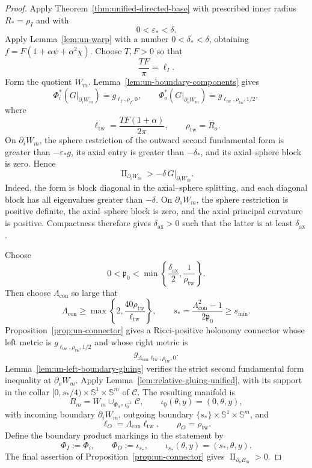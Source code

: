 \documentclass[11pt,reqno]{amsart}
\theoremstyle{definition}
\numberwithin{equation}{section}
\DeclareMathOperator{\II}{II}
\begin{document}
\begin{proof}
Apply Theorem~\ref{thm:unified-directed-base} with prescribed inner
radius \(R_*=\rho_I\) and with
\[
 0<\varepsilon_*<\delta.
\]
Apply Lemma~\ref{lem:un-warp} with a number
\(0<\delta_*<\delta\), obtaining
\(f=F(1+\alpha\psi+\alpha^2\chi)\).
Choose \(T,F>0\) so that
\[
 \frac{TF}{\pi}=\ell_I.
\]
Form the quotient \(W_m\).  Lemma~\ref{lem:un-boundary-components}
gives
\[
 \Phi_i^*(G|_{\partial_iW_m})=g_{\ell_I,\rho_I,0},
 \qquad
 \Phi_o^*(G|_{\partial_oW_m})
 =g_{\ell_{\mathrm{tw}},\rho_{\mathrm{tw}},1/2},
\]
where
\[
 \ell_{\mathrm{tw}}=\frac{TF(1+\alpha)}{2\pi},
 \qquad \rho_{\mathrm{tw}}=R_o.
\]
On \(\partial_iW_m\), the sphere restriction of the outward second
fundamental form is greater than \(-\varepsilon_*g\), its axial entry is
greater than \(-\delta_*\), and its axial--sphere block is zero.  Hence
\[
 \II_{\partial_iW_m}>-\delta\,G|_{\partial_iW_m}.
\]
Indeed, the form is block diagonal in the axial--sphere splitting, and
each diagonal block has all eigenvalues greater than \(-\delta\).
On \(\partial_oW_m\), the sphere restriction is positive definite, the
axial--sphere block is zero, and the axial principal curvature is
positive.  Compactness therefore gives \(\delta_{\mathrm{ax}}>0\) such
that the latter is at least \(\delta_{\mathrm{ax}}\).

Choose
\[
 0<\mathfrak p_0<
 \min\left\{\frac{\delta_{\mathrm{ax}}}{2},
                  \frac1{\rho_{\mathrm{tw}}}\right\}.
\]
Then choose \(\Lambda_{\mathrm{con}}\) so large that
\[
 \Lambda_{\mathrm{con}}\ge
 \max\left\{2,\frac{40\rho_{\mathrm{tw}}}{\ell_{\mathrm{tw}}}\right\},
 \qquad
 s_*=\frac{\Lambda_{\mathrm{con}}^2-1}{2\mathfrak p_0}
 \ge s_{\min}.
\]
Proposition~\ref{prop:un-connector} gives a Ricci-positive holonomy connector
whose left metric is
\(g_{\ell_{\mathrm{tw}},\rho_{\mathrm{tw}},1/2}\) and whose right metric is
\[
 g_{\Lambda_{\mathrm{con}}\ell_{\mathrm{tw}},\rho_{\mathrm{tw}},0}.
\]
Lemma~\ref{lem:un-left-boundary-gluing} verifies the strict second
fundamental form inequality at \(\partial_oW_m\).  Apply
Lemma~\ref{lem:relative-gluing-unified}, with its support in the collar
$[0,s_*/4)\times\mathbb S^1\times\mathbb S^m$ of $\mathcal C$.  The resulting manifold is
\[
 B_m=W_m\cup_{\Phi_o\circ\iota_0^{-1}}\mathcal C,
 \qquad
 \iota_0(\theta,y)=(0,\theta,y),
\]
with incoming boundary \(\partial_iW_m\), outgoing boundary
\(\{s_*\}\times\mathbb S^1\times\mathbb S^m\), and
\[
 \ell_O=\Lambda_{\mathrm{con}}\ell_{\mathrm{tw}},
 \qquad \rho_O=\rho_{\mathrm{tw}}.
\]
Define the boundary product markings in the statement by
\[
 \Phi_I:=\Phi_i,\qquad
 \Phi_O:=\iota_{s_*},\qquad
 \iota_{s_*}(\theta,y)=(s_*,\theta,y).
\]
The final assertion of Proposition~\ref{prop:un-connector} gives
\(\II_{\partial_oB_m}>0\).


\end{proof}
\end{document}
